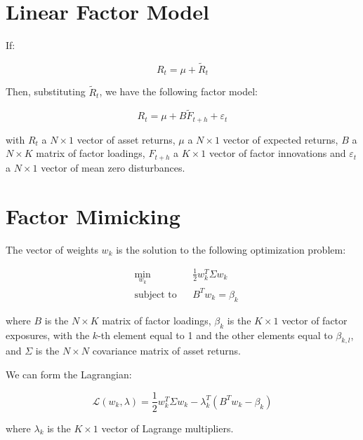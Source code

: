 \section{Linear Factor Model}

If:

\begin{equation}
    R_t = \mu + \tilde{R}_t
\end{equation}

Then, substituting $\tilde{R}_t$, we have the following factor model:

\begin{equation}
    R_t = \mu + B \tilde{F}_{t+h} + \varepsilon_t
\end{equation}

with $R_t$ a $N \times 1$ vector of 
asset returns, $\mu$ a $N \times 1$ vector
of expected returns, $B$ a $N \times K$ matrix
of factor loadings, $F_{t+h}$ a $K \times 1$ vector
of factor innovations and $\varepsilon_t$ a $N \times 1$
vector of mean zero disturbances.



\section{Factor Mimicking}

The vector of weights $w_k$ 
is the solution to the following optimization problem:

\begin{equation}
    \begin{aligned}
        & \underset{w_k}{\min}
        & &  \frac{1}{2} w_k^T \Sigma w_k \\
        & \text{subject to}
        & & B^T w_k = \beta_k
    \end{aligned}
\end{equation}

where $B$ is the $N \times K$ matrix of factor loadings, $\beta_k$ is the $K \times 1$ vector of factor exposures,
with the $k$-th element equal to 1 and the other elements equal to $\beta_{k,l}$, 
and $\Sigma$ is the $N \times N$ covariance matrix of asset returns.

We can form the Lagrangian:

\begin{equation}
    \mathcal{L}(w_k, \lambda) = \frac{1}{2} w_k^T \Sigma w_k - \lambda_k^T (B^T w_k - \beta_k)
\end{equation}

where $\lambda_k$ is the $K \times 1$ vector of Lagrange multipliers.

